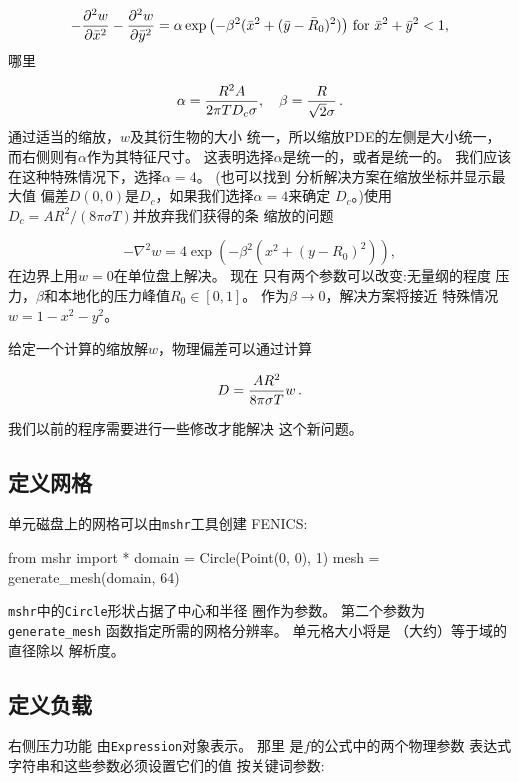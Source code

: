 \[ -\frac{\partial^2 w}{\partial\bar x^2}
-\frac{\partial^2 w}{\partial\bar y^2}= \alpha
\exp{\left(
- \beta^2(\bar x^2
+ (\bar y-\bar R_0)^2)\right)}\hbox{ for } \bar x^2 + \bar y^2 < 1,\]
哪里

\[ \alpha = \frac{R^2A}{2\pi T D_c\sigma},\quad\beta = \frac{R}{\sqrt{2}\sigma}\tp\]
通过适当的缩放，$w$及其衍生物的大小
统一，所以缩放PDE的左侧是大小统一，
而右侧则有$\alpha$作为其特征尺寸。
这表明选择$\alpha$是统一的，或者是统一的。 我们应该
在这种特殊情况下，选择$\alpha=4$。 (也可以找到
分析解决方案在缩放坐标并显示最大值
偏差$D(0,0)$是$D_c$，如果我们选择$\alpha=4$来确定
$D_c$。)使用$D_c=AR^2/(8\pi\sigma T)$并放弃我们获得的条
缩放的问题

\begin{equation}
-\nabla^2w = 4\exp{\left(
- \beta^2(x^2
+ (y-R_0)^2)\right)},
\label{ch:poisson0:membrane:scaled:eq}
\end{equation}
在边界上用$w=0$在单位盘上解决。 现在
只有两个参数可以改变:无量纲的程度
压力，$\beta$和本地化的压力峰值$R_0\in
[0,1]$。 作为$\beta\rightarrow 0$，解决方案将接近
特殊情况$w=1-x^2-y^2$。

给定一个计算的缩放解$w$，物理偏差可以通过计算

\[ D = \frac{AR^2}{8\pi\sigma T}w\tp\]

我们以前的程序需要进行一些修改才能解决
这个新问题。

\subsection{定义网格}

单元磁盘上的网格可以由\texttt{mshr}工具创建
FENICS:

\begin{python}
from mshr import *
domain = Circle(Point(0, 0), 1)
mesh = generate_mesh(domain, 64)
\end{python}

\texttt{mshr}中的\texttt{Circle}形状占据了中心和半径
圈作为参数。 第二个参数为\verb!generate_mesh!
函数指定所需的网格分辨率。 单元格大小将是
（大约）等于域的直径除以
解析度。

\subsection{定义负载}


右侧压力功能
由\texttt{Expression}对象表示。 那里
是$f$的公式中的两个物理参数
表达式字符串和这些参数必须设置它们的值
按关键词参数:

